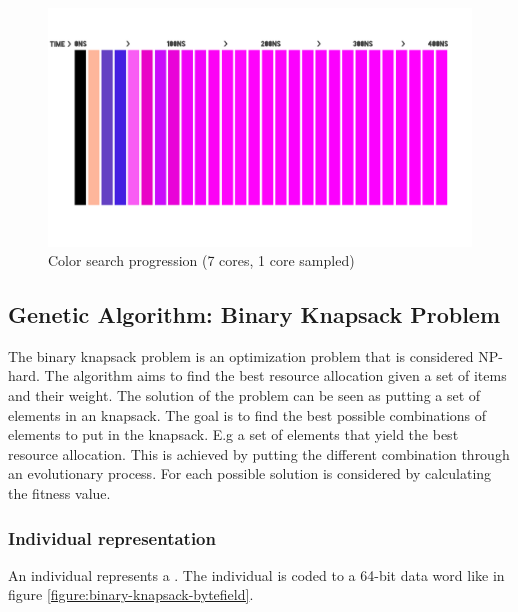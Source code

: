 \begin{figure}[H]
    \begin{center}
        \includegraphics[width=\textwidth]{fig/color-search}
    \caption{Color search progression (7 cores, 1 core sampled)}
    \label{figure:color-search}
    \end{center}
\end{figure}

\subsection{Genetic Algorithm: Binary Knapsack Problem}

The binary knapsack problem is an optimization problem that is considered NP-hard. The algorithm aims to find the best resource allocation given a set of items and their weight. The solution of the problem can be seen as putting a set of elements in an knapsack. The goal is to find the best possible combinations of elements to put in the knapsack. E.g  a set of elements that yield the best resource allocation. This is achieved by putting the different combination through an evolutionary process. For each possible solution is considered by calculating the fitness value. 







\subsubsection{Individual representation}

An individual represents a .
The individual is coded to a 64-bit data word like in figure \vref{figure:binary-knapsack-bytefield}.

